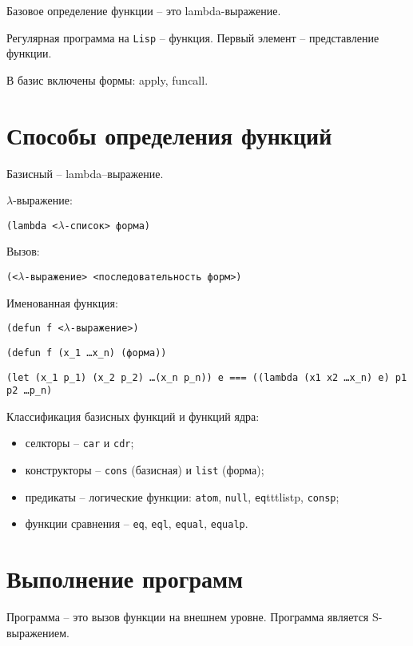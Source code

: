 Базовое определение функции -- это lambda-выражение.

Регулярная программа на \texttt{Lisp} -- функция. Первый элемент -- представление функции.

В базис включены формы: apply, funcall.

\section{Способы определения функций}

Базисный -- lambda--выражение.

$\lambda$-выражение:

\texttt{(lambda <$\lambda$-список> форма)}

Вызов:

\texttt{(<$\lambda$-выражение> <последовательность форм>)}

Именованная функция:

\texttt{(defun f <$\lambda$-выражение>)}

\texttt{(defun f (x_1 \dots x_n) (форма))}

\texttt{(let (x_1 p_1) (x_2 p_2) \dots (x_n p_n)) e === ((lambda (x1 x2 \dots x_n) e) p1 p2 \dots p_n)}

Классификация базисных функций и функций ядра:
\begin{itemize}
    \item селкторы -- \texttt{car} и \texttt{cdr};
    \item конструкторы -- \texttt{cons} (базисная) и \texttt{list} (форма);
    \item предикаты -- логические функции: \texttt{atom}, \texttt{null}, \tex\texttt{eq}ttt{listp}, \texttt{consp};
    \item функции сравнения -- \texttt{eq}, \texttt{eql}, \texttt{equal}, \texttt{equalp}.
\end{itemize}

\section{Выполнение программ}

Программа -- это вызов функции на внешнем уровне. Программа является S-выражением.
